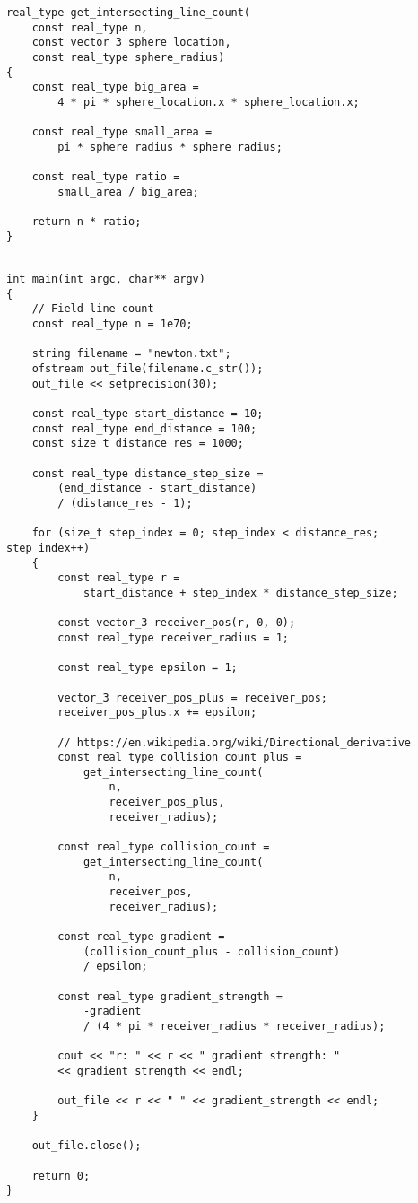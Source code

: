 \documentclass[12pt]{article}
\begin{document}
\begin{lstlisting}
real_type get_intersecting_line_count(
	const real_type n,
	const vector_3 sphere_location,
	const real_type sphere_radius)
{
	const real_type big_area = 
		4 * pi * sphere_location.x * sphere_location.x;

	const real_type small_area = 
		pi * sphere_radius * sphere_radius;
	
	const real_type ratio = 
		small_area / big_area;
	
	return n * ratio;
}

\end{lstlisting}


\begin{lstlisting}

int main(int argc, char** argv)
{
	// Field line count
	const real_type n = 1e70;

	string filename = "newton.txt";
	ofstream out_file(filename.c_str());
	out_file << setprecision(30);

	const real_type start_distance = 10;
	const real_type end_distance = 100;
	const size_t distance_res = 1000;

	const real_type distance_step_size =
		(end_distance - start_distance) 
		/ (distance_res - 1);

	for (size_t step_index = 0; step_index < distance_res; step_index++)
	{
		const real_type r = 
			start_distance + step_index * distance_step_size;

		const vector_3 receiver_pos(r, 0, 0);
		const real_type receiver_radius = 1;

		const real_type epsilon = 1;

		vector_3 receiver_pos_plus = receiver_pos;
		receiver_pos_plus.x += epsilon;

		// https://en.wikipedia.org/wiki/Directional_derivative
		const real_type collision_count_plus = 
			get_intersecting_line_count(
				n, 
				receiver_pos_plus, 
				receiver_radius);
		
		const real_type collision_count = 
			get_intersecting_line_count(
				n, 
				receiver_pos, 
				receiver_radius);
		
		const real_type gradient = 
			(collision_count_plus - collision_count) 
			/ epsilon;

		const real_type gradient_strength = 
			-gradient 
			/ (4 * pi * receiver_radius * receiver_radius);

		cout << "r: " << r << " gradient strength: " 
		<< gradient_strength << endl;

		out_file << r << " " << gradient_strength << endl;
	}

	out_file.close();

	return 0;
}

\end{lstlisting}







\end{document}
